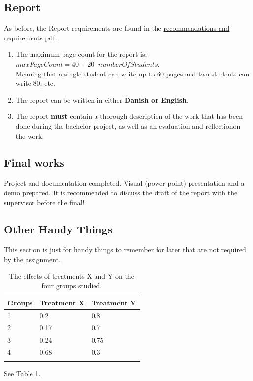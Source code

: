 \documentclass[
english, %
headsepline, %
]{scrartcl} %
\begin{document}
    \subsection{Report}
    \label{sec:report}
        As before, the Report requirements are found in the \href{https://datsoftlyngby.github.io/soft2020fall/resources/bbe51cf2-bachelorProject.pdf}{recommendations and requirements pdf}.
        \begin{enumerate}
            \item The maximum page count for the report is:\\$maxPageCount = 40 + 20 \cdot numberOfStudents$.\\
                Meaning that a single student can write up to 60 pages and two students can write 80, etc.
            \item The report can be written in either \textbf{Danish or English}.
            \item The report \textbf{must} contain a thorough description of the work that has been done during the bachelor project, 
                as well as an evaluation and reflectionon the work.
        \end{enumerate}

    \subsection{Final  works}
    \label{sec:Final  works}
        Project and documentation completed. Visual (power point) presentation and a demo prepared. 
        It is recommended to discuss the draft of the report with the supervisor before the final!

    \subsection{Other Handy Things}
    This section is just for handy things to remember for later that are not required by the assignment.
    \label{sec:Other Handy Things}
        \begin{table}
            \caption{The effects of treatments X and Y on the four groups studied.}
            \label{tab:treatments}
            \centering
            \begin{tabular}{l l l}
                \toprule
                {Groups} & {Treatment X} & {Treatment Y}\\
                \midrule
                1 & 0.2 & 0.8\\
                2 & 0.17 & 0.7\\
                3 & 0.24 & 0.75\\
                4 & 0.68 & 0.3\\
                \bottomrule\\
            \end{tabular}
        \end{table}
        See Table \ref{tab:treatments}.
\end{document}
